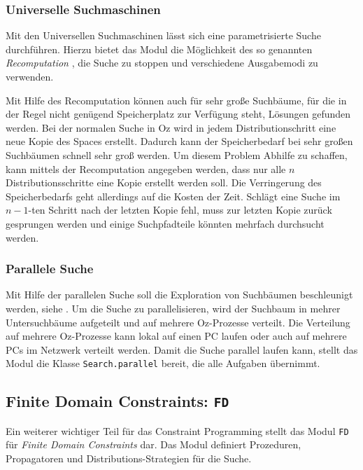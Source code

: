 \subsubsection{Universelle Suchmaschinen}

Mit den Universellen Suchmaschinen lässt sich eine parametrisierte Suche
durchführen. Hierzu bietet das Modul die Möglichkeit des so genannten
\textsl{Recomputation} \cite[System Modules, Part II, Chapter
4.2]{url:mozart-documentation}, die Suche zu stoppen
und verschiedene Ausgabemodi zu verwenden.

Mit Hilfe des Recomputation können auch für sehr große Suchbäume, für die in der
Regel nicht genügend Speicherplatz zur Verfügung steht, Lösungen gefunden
werden. Bei der normalen Suche in Oz wird in jedem Distributionschritt eine
neue Kopie des Spaces erstellt. Dadurch kann der Speicherbedarf bei sehr großen
Suchbäumen schnell sehr groß werden. Um diesem Problem Abhilfe zu schaffen, kann
mittels der Recomputation angegeben werden, dass nur alle $n$ Distributionsschritte
eine Kopie erstellt werden soll. Die Verringerung des Speicherbedarfs geht
allerdings auf die Kosten der Zeit. Schlägt eine Suche im $n-1$-ten Schritt nach
der letzten Kopie fehl, muss zur letzten Kopie zurück gesprungen werden und
einige Suchpfadteile könnten mehrfach durchsucht werden.

\subsubsection{Parallele Suche}

Mit Hilfe der parallelen Suche soll die Exploration von Suchbäumen beschleunigt
werden, siehe \cite[System Modules, Part II, Chapter
4.4]{url:mozart-documentation}. Um die Suche zu parallelisieren,
wird der Suchbaum in mehrer Untersuchbäume aufgeteilt und auf mehrere
Oz-Prozesse verteilt. Die Verteilung auf mehrere Oz-Prozesse kann lokal auf
einen PC laufen oder auch auf mehrere PCs im Netzwerk verteilt werden. Damit die
Suche parallel laufen kann, stellt das Modul die Klasse \texttt{Search.parallel}
bereit, die alle Aufgaben übernimmt.

\subsection{Finite Domain Constraints: \texttt{FD}}
\label{subsection:FD}

Ein weiterer wichtiger Teil für das Constraint Programming stellt das Modul
\texttt{FD} für \textsl{Finite Domain Constraints} dar. Das Modul definiert
Prozeduren, Propagatoren und Distributions-Strategien für die Suche.

